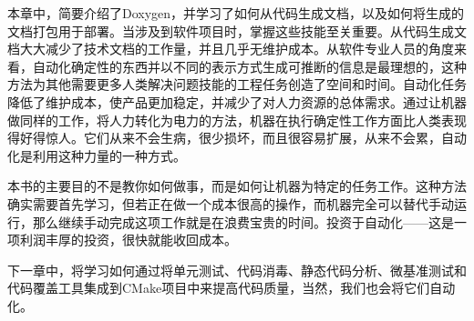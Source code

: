 本章中，简要介绍了Doxygen，并学习了如何从代码生成文档，以及如何将生成的文档打包用于部署。当涉及到软件项目时，掌握这些技能至关重要。从代码生成文档大大减少了技术文档的工作量，并且几乎无维护成本。从软件专业人员的角度来看，自动化确定性的东西并以不同的表示方式生成可推断的信息是最理想的，这种方法为其他需要更多人类解决问题技能的工程任务创造了空间和时间。自动化任务降低了维护成本，使产品更加稳定，并减少了对人力资源的总体需求。通过让机器做同样的工作，将人力转化为电力的方法，机器在执行确定性工作方面比人类表现得好得惊人。它们从来不会生病，很少损坏，而且很容易扩展，从来不会累，自动化是利用这种力量的一种方式。

本书的主要目的不是教你如何做事，而是如何让机器为特定的任务工作。这种方法确实需要首先学习，但若正在做一个成本很高的操作，而机器完全可以替代手动运行，那么继续手动完成这项工作就是在浪费宝贵的时间。投资于自动化——这是一项利润丰厚的投资，很快就能收回成本。

下一章中，将学习如何通过将单元测试、代码消毒、静态代码分析、微基准测试和代码覆盖工具集成到CMake项目中来提高代码质量，当然，我们也会将它们自动化。
